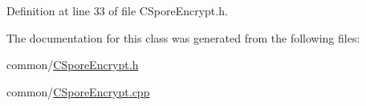 \-Definition at line 33 of file \-C\-Spore\-Encrypt.\-h.



\-The documentation for this class was generated from the following files\-:\begin{DoxyCompactItemize}
\item 
common/\hyperlink{_c_spore_encrypt_8h}{\-C\-Spore\-Encrypt.\-h}\item 
common/\hyperlink{_c_spore_encrypt_8cpp}{\-C\-Spore\-Encrypt.\-cpp}\end{DoxyCompactItemize}

